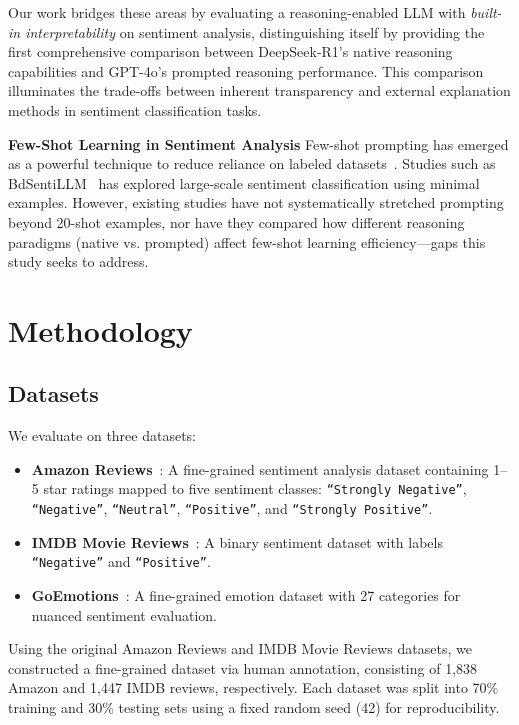 \documentclass{IEEEcsmag}
\begin{document}
Our work bridges these areas by evaluating a reasoning-enabled LLM with \textit{built-in interpretability} on sentiment analysis, distinguishing itself by providing the first comprehensive comparison between DeepSeek-R1's native reasoning capabilities and GPT-4o's prompted reasoning performance. This comparison illuminates the trade-offs between inherent transparency and external explanation methods in sentiment classification tasks.

\noindent\textbf{Few-Shot Learning in Sentiment Analysis}
Few-shot prompting has emerged as a powerful technique to reduce reliance on labeled datasets~\cite{huang2024automating}. Studies such as BdSentiLLM~\cite{ipa2024bdsentillm} has explored large-scale sentiment classification using minimal examples. However, existing studies have not systematically stretched prompting beyond 20-shot examples, nor have they compared how different reasoning paradigms (native vs. prompted) affect few-shot learning efficiency—gaps this study seeks to address.

\vspace{-20pt}
\section{Methodology}

\subsection{Datasets}

We evaluate on three datasets:

\begin{itemize}[itemsep=1pt, topsep=1pt, leftmargin=*]
    \item \textbf{Amazon Reviews}~\cite{mukherjee2019utilization}: A fine-grained sentiment analysis dataset containing 1–5 star ratings mapped to five sentiment classes: \texttt{``Strongly Negative''}, \texttt{``Negative''}, \texttt{``Neutral''}, \texttt{``Positive''}, and  \texttt{``Strongly Positive''}.
    \item \textbf{IMDB Movie Reviews}~\cite{steinke2022sentiment}: A binary sentiment dataset with labels \texttt{``Negative''} and \texttt{``Positive''}.
    \item \textbf{GoEmotions}~\cite{demszky2020goemotions,bashynska2024research}: A fine-grained emotion dataset with 27 categories for nuanced sentiment evaluation.
\end{itemize}

Using the original Amazon Reviews and IMDB Movie Reviews datasets, we constructed a fine-grained dataset via human annotation, consisting of 1,838 Amazon and 1,447 IMDB reviews, respectively. Each dataset was split into 70\% training and 30\% testing sets using a fixed random seed (42) for reproducibility. 
\end{document}
